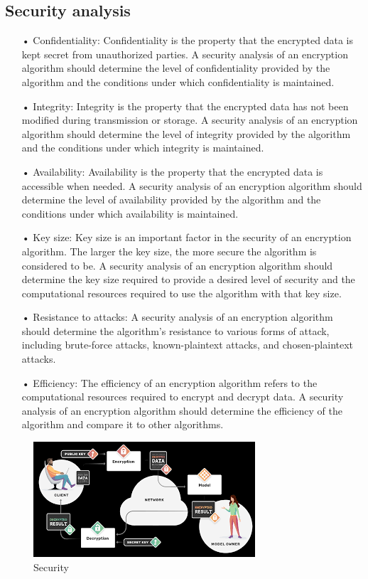 \documentclass[conference]{IEEEtran}
\begin{document}
\subsection{Security analysis}
\begin{itemize}
\item[•] Confidentiality: Confidentiality is the property that the encrypted data is kept secret from unauthorized parties. A security analysis of an encryption algorithm should determine the level of confidentiality provided by the algorithm and the conditions under which confidentiality is maintained.
\item[•] Integrity: Integrity is the property that the encrypted data has not been modified during transmission or storage. A security analysis of an encryption algorithm should determine the level of integrity provided by the algorithm and the conditions under which integrity is maintained.
\item[•] Availability: Availability is the property that the encrypted data is accessible when needed. A security analysis of an encryption algorithm should determine the level of availability provided by the algorithm and the conditions under which availability is maintained.

\item[•] Key size: Key size is an important factor in the security of an encryption algorithm. The larger the key size, the more secure the algorithm is considered to be. A security analysis of an encryption algorithm should determine the key size required to provide a desired level of security and the computational resources required to use the algorithm with that key size.

\item[•] Resistance to attacks: A security analysis of an encryption algorithm should determine the algorithm's resistance to various forms of attack, including brute-force attacks, known-plaintext attacks, and chosen-plaintext attacks.

\item[•] Efficiency: The efficiency of an encryption algorithm refers to the computational resources required to encrypt and decrypt data. A security analysis of an encryption algorithm should determine the efficiency of the algorithm and compare it to other algorithms.
\end{itemize}
\begin{figure}[h]
	\centering
	\includegraphics[width=1\linewidth]{security.png}
	\caption{Security}
	\label{fig:security.png}
\end{figure}
\end{document}
